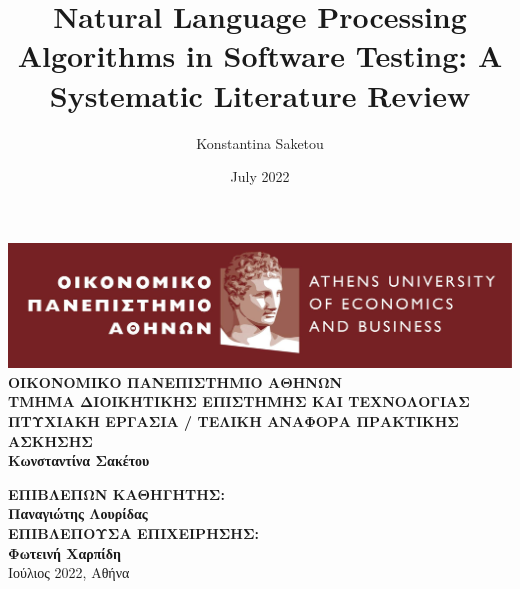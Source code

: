 \documentclass[11pt]{report}
\title{Natural Language Processing Algorithms in Software Testing: A Systematic Literature Review}
\author{Konstantina Saketou}
\date{July 2022}
\begin{document}
  \begin{titlepage}
    \centering
    \includegraphics[width=17cm]{images/aueb_logo.jpg}
    \vfill
    {\bfseries\Large
        ΟΙΚΟΝΟΜΙΚΟ ΠΑΝΕΠΙΣΤΗΜΙΟ ΑΘΗΝΩΝ\\
        \vskip0.5cm
        ΤΜΗΜΑ ΔΙΟΙΚΗΤΙΚΗΣ ΕΠΙΣΤΗΜΗΣ ΚΑΙ ΤΕΧΝΟΛΟΓΙΑΣ\\
        \vskip0.5cm
        ΠΤΥΧΙΑΚΗ ΕΡΓΑΣΙΑ / ΤΕΛΙΚΗ ΑΝΑΦΟΡΑ ΠΡΑΚΤΙΚΗΣ ΑΣΚΗΣΗΣ\\
        
    }       
    \vfill
    {\bfseries\Large        
        Κωνσταντίνα Σακέτου\\
    } 
    
    \vfill{\bfseries\Large  
      ΕΠΙΒΛΕΠΩΝ ΚΑΘΗΓΗΤΗΣ:\\
      Παναγιώτης Λουρίδας\\ 
      \vskip1cm
      ΕΠΙΒΛΕΠΟΥΣΑ ΕΠΙΧΕΙΡΗΣΗΣ:\\
      Φωτεινή Χαρπίδη\\
    } 
    \vfill{\normalsize Ιούλιος 2022, Αθήνα}
  \end{titlepage}


\nocite{*}




\end{document}
